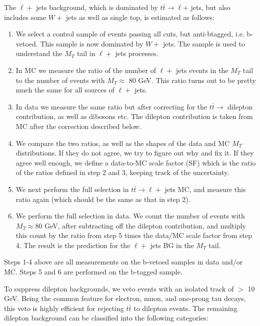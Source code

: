 The $\ell +$ jets background, which is dominated by 
$t\bar{t} \to \ell $+ jets, but also includes some $W +$ jets as well as single top,
is estimated as follows:
\begin{enumerate}
\item We select a control sample of events passing all cuts, but anti-btagged, i.e. b-vetoed.  This
sample is now dominated by $W +$ jets.  The sample is used to understand the
$M_T$ tail in $\ell +$ jets processes. 
\item In MC we measure the ratio of the number of $\ell +$ jets events in the $M_T$ tail to
the number of events with $M_T \approx$ 80 GeV.  This ratio turns out to be pretty much the
same for all sources of $\ell +$ jets.
\item In data we measure the same ratio but after correcting for the $t\bar{t} \to$ dilepton
contribution, as well as dibosons etc.  The dilepton contribution is taken from MC after 
the correction described below.  
\item We compare the two ratios, as well as the shapes of the data and MC $M_T$ distributions. 
If they do not agree, we try to figure out why and fix it.  If they agree well enough, we define a 
data-to-MC scale factor (SF) which is the ratio of the  ratios defined in step 2 and 3, keeping track of the 
uncertainty.  
\item We next perform the full selection in $t\bar{t} \to \ell +$ jets MC, and measure this ratio
again (which should be the same as that in step 2).
\item 
We perform the full selection in data. We count the number of events with $M_T \approx 80$ GeV, after subtracting off the dilepton contribution,
  and multiply this count by the ratio from step 5 times the data/MC scale factor from step 4.
The result is the prediction for the $\ell +$ jets BG in the $M_T$ tail.
\end{enumerate}

Steps 1-4 above are all measurements on the b-vetoed samples in data and/or MC. Steps 5 and 6 are performed on the b-tagged sample.

To suppress dilepton backgrounds, we veto events with an isolated track of \pt $>$ 10 GeV. 
Being the common feature for electron, muon, and one-prong
tau decays, this veto is highly efficient for rejecting 
$t\bar{t}$ to dilepton events. The remaining dilepton background can be classified into the following categories:


